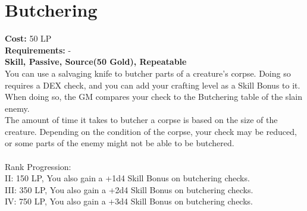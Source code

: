 \section{Butchering}\label{perk:butchering}
\textbf{Cost:} 50 LP\\
\textbf{Requirements:} -\\
\textbf{Skill, Passive, Source(50 Gold), Repeatable}\\
You can use a salvaging knife to butcher parts of a creature's corpse.
Doing so requires a DEX check, and you can add your crafting level as a Skill Bonus to it.
When doing so, the GM compares your check to the Butchering table of the slain enemy.\\
The amount of time it takes to butcher a corpse is based on the size of the creature.
Depending on the condition of the corpse, your check may be reduced, or some parts of the enemy might not be able to be butchered.\\
\\
Rank Progression:\\
II: 150 LP, You also gain a +1d4 Skill Bonus on butchering checks.\\
III: 350 LP, You also gain a +2d4 Skill Bonus on butchering checks.\\
IV: 750 LP, You also gain a +3d4 Skill Bonus on butchering checks.\\